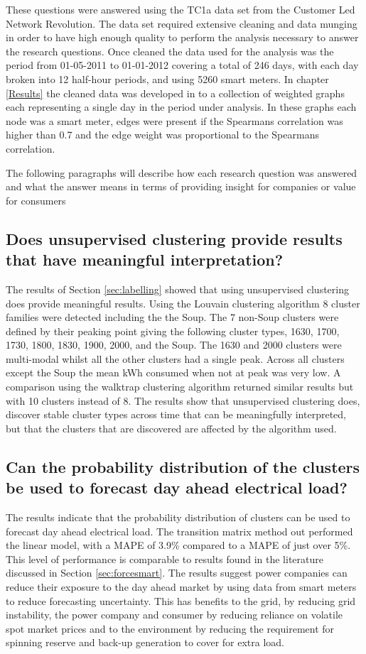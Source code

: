 These questions were answered using the TC1a data set from the Customer Led Network Revolution. The data set required extensive cleaning and data munging in order to have high enough quality to perform the analysis necessary to answer the research questions. Once cleaned the data used for the analysis was the period from 01-05-2011 to 01-01-2012 covering a total of 246 days, with each day broken into 12 half-hour periods, and using 5260 smart meters.  
In chapter \ref{Results} the cleaned data was developed in to a collection of weighted graphs each representing a single day in the period under analysis. In these graphs each node was a smart meter, edges were present if the Spearmans correlation was higher than 0.7 and the edge weight was proportional to the Spearmans correlation. 

The following paragraphs will describe how each research question was answered and what the answer means in terms of providing insight for companies or value for consumers

\subsection{Does unsupervised clustering provide results that have meaningful interpretation?}
The results of Section \ref{sec:labelling} showed that using unsupervised clustering does provide meaningful results. Using the Louvain clustering algorithm 8 cluster families were detected including the the Soup. The 7 non-Soup clusters were defined by their peaking point giving the following cluster types,  1630, 1700, 1730, 1800, 1830, 1900, 2000, and the Soup. The 1630 and 2000 clusters were multi-modal whilst all the other clusters had a single peak. Across all clusters except the Soup the mean kWh consumed when not at peak was very low. A comparison using the walktrap clustering algorithm returned similar results but with 10 clusters instead of 8. The results show that unsupervised clustering does, discover stable cluster types across time that can be meaningfully interpreted, but that the clusters that are discovered are affected by the algorithm used.


\subsection{Can the probability distribution of the clusters be used to forecast day ahead electrical load?}
The results indicate that the probability distribution of clusters can be used to forecast day ahead electrical load. The transition matrix method out performed the linear model, with a MAPE of 3.9\% compared to a MAPE of just over 5\%. This level of performance is comparable to results found in the literature discussed in Section \ref{sec:forcesmart}. The results suggest power companies can reduce their exposure to the day ahead market by using data from smart meters to reduce forecasting uncertainty. This has benefits to the grid, by reducing grid instability, the power company and consumer by reducing  reliance on volatile spot market prices and to the environment by reducing the requirement for spinning reserve and back-up generation to cover for extra load. 

